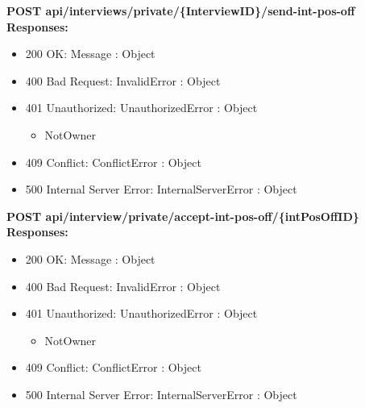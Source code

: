 \noindent\textbf{\color{titleColor}POST api/interviews/private/\{InterviewID\}/send-int-pos-off}
\vspace{2pt}
\\\textbf{\color{titleColor}Responses:} 
\begin{itemize}
    \item {\color{titleColor}200 OK:} Message : Object
    \item {\color{titleColor}400 Bad Request:} InvalidError : Object
    \item {\color{titleColor}401 Unauthorized:} UnauthorizedError : Object
    \begin{itemize}
        \item NotOwner
    \end{itemize}
    \item {\color{titleColor}409 Conflict:} ConflictError : Object
    \item {\color{titleColor}500 Internal Server Error:} InternalServerError : Object
\end{itemize}
\vspace{10pt}
\noindent{\color{titleColor}\rule{0.8\linewidth}{0.2mm}}
\vspace{10pt}

\noindent\textbf{\color{titleColor}POST api/interview/private/accept-int-pos-off/\{intPosOffID\}}
\vspace{2pt}
\\\textbf{\color{titleColor}Responses:} 
\begin{itemize}
    \item {\color{titleColor}200 OK:} Message : Object
    \item {\color{titleColor}400 Bad Request:} InvalidError : Object
    \item {\color{titleColor}401 Unauthorized:} UnauthorizedError : Object
    \begin{itemize}
        \item NotOwner
    \end{itemize}
    \item {\color{titleColor}409 Conflict:} ConflictError : Object
    \item {\color{titleColor}500 Internal Server Error:} InternalServerError : Object
\end{itemize}
\vspace{10pt}
\noindent{\color{titleColor}\rule{0.8\linewidth}{0.2mm}}
\vspace{10pt}

